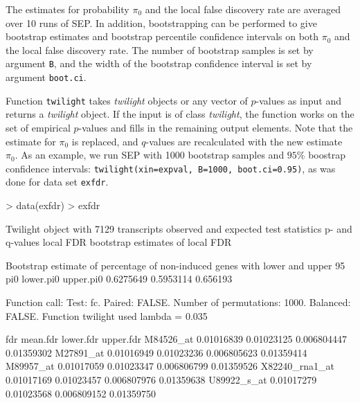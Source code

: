 \documentclass[11pt,a4paper,fleqn]{report}
\newcommand{\Robject}[1]{{\texttt{#1}}}
\newcommand{\Rfunction}[1]{{\texttt{#1}}}
\newcommand{\Rclass}[1]{{\textit{#1}}}
\newcommand{\Rfunarg}[1]{{\texttt{#1}}}
\begin{document}
The estimates for probability $\pi_0$ and the local false discovery rate are averaged over 10 runs of SEP. In addition, bootstrapping can be performed to give bootstrap estimates and bootstrap percentile confidence intervals on both $\pi_0$ and the local false discovery rate. The number of bootstrap samples is set by argument \Rfunarg{B}, and the width of the bootstrap confidence interval is set by argument \Rfunarg{boot.ci}.

Function \Rfunction{twilight} takes \Rclass{twilight} objects or any vector of $p$-values as input and returns a \Rclass{twilight} object. If the input is of class \Rclass{twilight}, the function works on the set of empirical $p$-values and fills in the remaining output elements. Note that the estimate for $\pi_0$ is replaced, and $q$-values are recalculated with the new estimate $\pi_0$.
As an example, we run SEP with 1000 bootstrap samples and $95\%$ boostrap confidence intervals: \Rfunction{twilight(xin=expval, B=1000, boot.ci=0.95)}, as was done for data set \Robject{exfdr}.
\begin{Schunk}
\begin{Sinput}
> data(exfdr)
> exfdr
\end{Sinput}
\begin{Soutput}
 Twilight object with
     7129 transcripts
     observed and expected test statistics
     p- and q-values
     local FDR
     bootstrap estimates of local FDR

 Bootstrap estimate of percentage of non-induced
 genes with lower and upper 95% CI:
       pi0 lower.pi0 upper.pi0
 0.6275649 0.5953114  0.656193

 Function call:
 Test: fc. Paired: FALSE. Number of permutations: 1000. Balanced: FALSE. 
 Function twilight used lambda = 0.035 
\end{Soutput}
\end{Schunk}
\begin{Schunk}
\begin{Soutput}
                      fdr   mean.fdr   lower.fdr  upper.fdr
M84526_at      0.01016839 0.01023125 0.006804447 0.01359302
M27891_at      0.01016949 0.01023236 0.006805623 0.01359414
M89957_at      0.01017059 0.01023347 0.006806799 0.01359526
X82240_rna1_at 0.01017169 0.01023457 0.006807976 0.01359638
U89922_s_at    0.01017279 0.01023568 0.006809152 0.01359750
\end{Soutput}
\end{Schunk}
\end{document}
